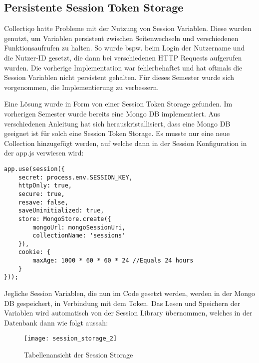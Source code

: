 \subsection{Persistente Session Token Storage}\label{subsec:persistente-session-token-storage}
Collectiqo hatte Probleme mit der Nutzung von Session Variablen.
Diese wurden genutzt, um Variablen persistent zwischen Seitenwechseln und verschiedenen Funktionsaufrufen zu halten.
So wurde bspw. beim Login der Nutzername und die Nutzer-ID gesetzt, die dann bei verschiedenen HTTP Requests aufgerufen wurden.
Die vorherige Implementation war fehlerbehaftet und hat oftmals die Session Variablen nicht persistent gehalten.
Für dieses Semester wurde sich vorgenommen, die Implementierung zu verbessern.

Eine Lösung wurde in Form von einer Session Token Storage gefunden.
Im vorherigen Semester wurde bereits eine Mongo DB implementiert.
Aus verschiedenen Anleitung hat sich herauskristallisiert, dass eine Mongo DB geeignet ist für solch eine Session Token Storage.
Es musste nur eine neue Collection hinzugefügt werden, auf welche dann in der Session Konfiguration in der app.js verwiesen wird:

\vspace{1em}
\lstset{language=javascript}
\begin{lstlisting}[label={lst:sessions}]
app.use(session({
    secret: process.env.SESSION_KEY,
    httpOnly: true,
    secure: true,
    resave: false,
    saveUninitialized: true,
    store: MongoStore.create({
        mongoUrl: mongoSessionUri,
        collectionName: 'sessions'
    }),
    cookie: {
        maxAge: 1000 * 60 * 60 * 24 //Equals 24 hours
    }
}));
\end{lstlisting}
\vspace{1em}

Jegliche Session Variablen, die nun im Code gesetzt werden, werden in der Mongo DB gespeichert, in Verbindung mit dem Token.
Das Lesen und Speichern der Variablen wird automatisch von der Session Library übernommen, welches in der Datenbank dann wie folgt aussah:

\begin{figure}[h]
    \centering
    \texttt{[image: session\_storage\_2]}
    \caption{Tabellenansicht der Session Storage}
    \label{fig:session_storage_2}
\end{figure}